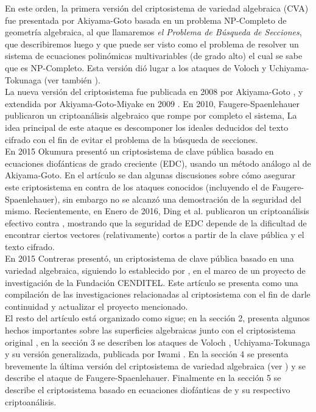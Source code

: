 \documentclass[11pt]{article}
\numberwithin{equation}{section} %
\numberwithin{figure}{section} %
\numberwithin{table}{section} %
\begin{document}
		En este orden, la primera versi\'on del criptosistema de variedad algebraica (CVA) fue presentada por Akiyama-Goto \cite{AG04} basada en un problema NP-Completo de geometr\'ia algebraica, al que llamaremos \emph{el Problema de B\'usqueda de Secciones}, que describiremos luego y que puede ser visto como el problema de resolver un sistema de ecuaciones polin\'omicas multivariables (de grado alto) el cual se sabe que es NP-Completo. Esta versi\'on di\'o lugar a los ataques de Voloch \cite{Vol07} y Uchiyama-Tokunaga \cite{UT} (ver tambi\'en \cite{Iw08}).\\

		La nueva versi\'on del criptosistema fue publicada en 2008 por Akiyama-Goto \cite{AG08}, y extendida por Akiyama-Goto-Miyake en 2009 \cite{AGM09}. En 2010, Faugere-Spaenlehauer \cite{FS} publicaron un criptoan\'alisis algebraico que rompe por completo el sistema, La idea principal de este ataque es descomponer los ideales deducidos del texto cifrado con el fin de evitar el problema de la b\'usqueda de secciones.\\

		En 2015 Okumura \cite{Oku15} present\'o un criptosistema de clave p\'ublica basado en ecuaciones diof\'anticas de grado creciente (EDC), usando un m\'etodo an\'alogo al de Akiyama-Goto. En el art\'iculo se dan algunas discusiones sobre c\'omo asegurar este criptosistema en contra de los ataques conocidos (incluyendo el de Faugere-Spaenlehauer), sin embargo no se alcanz\'o una demostraci\'on de la seguridad del mismo. Recientemente, en Enero de 2016, Ding et al. \cite{DKOTT} publicaron un criptoan\'alisis efectivo contra \cite{Oku15}, mostrando que la seguridad de EDC depende de la dificultad de encontrar ciertos vectores (relativamente) cortos a partir de la clave p\'ublica y el texto cifrado.\\

		En 2015 Contreras \cite{Con15} present\'o, un criptosistema de clave p\'ublica basado en una variedad algebraica, siguiendo lo establecido por \cite{AGM09}, en el marco de un proyecto de investigaci\'on de la Fundaci\'on CENDITEL. Este art\'iculo se presenta como una compilaci\'on de las investigaciones relacionadas al criptosistema con el fin de darle continuidad y actualizar el proyecto mencionado. \\

		El resto del art\'iculo est\'a organizado como sigue; en la secci\'on 2, presenta algunos hechos importantes sobre las superficies algebraicas junto con el criptosistema original \cite{AG04}, en la secci\'on 3 se describen los ataques de Voloch \cite{Vol07}, Uchiyama-Tokunaga \cite{UT}  y su versi\'on generalizada, publicada por Iwami \cite{Iw08}. En la secci\'on 4 se presenta brevemente la \'ultima versi\'on del criptosistema de variedad algebraica (ver \cite{AGM09}) y se describe el ataque de Faugere-Spaenlehauer. Finalmente en la secci\'on 5 se describe el criptosistema basado en ecuaciones diof\'anticas de \cite{Oku15} y su respectivo criptoan\'alisis.
\end{document}
